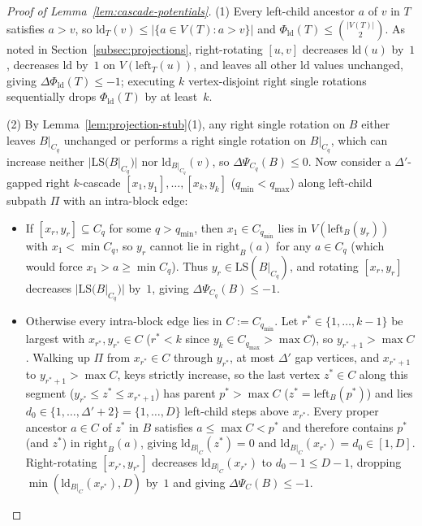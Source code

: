 \documentclass[11pt]{article}
\theoremstyle{definition}
\theoremstyle{remark}
\newcommand{\LS}{\mathrm{LS}}
\newcommand{\ld}{\mathrm{ld}}
\begin{document}
\begin{proof}[Proof of Lemma~\ref{lem:cascade-potentials}]
(1) Every left-child ancestor $a$ of $v$ in $T$ satisfies $a > v$, so $\ld_T(v) \le |\{a \in V(T) : a > v\}|$ and $\Phi_{\ld}(T) \le \binom{|V(T)|}{2}$. As noted in Section~\ref{subsec:projections}, right-rotating $[u, v]$ decreases $\ld(u)$ by~$1$, decreases $\ld$ by~$1$ on $V(\mathrm{left}_T(u))$, and leaves all other $\ld$ values unchanged, giving $\Delta\Phi_{\ld}(T) \le -1$; executing $k$ vertex-disjoint right single rotations sequentially drops $\Phi_{\ld}(T)$ by at least~$k$.

(2) By Lemma~\ref{lem:projection-stub}(1), any right single rotation on $B$ either leaves $B|_{C_q}$ unchanged or performs a right single rotation on $B|_{C_q}$, which can increase neither $|\LS(B|_{C_q})|$ nor $\ld_{B|_{C_q}}(v)$, so $\Delta\Psi_{C_q}(B) \le 0$. Now consider a $\Delta'$-gapped right $k$-cascade $[x_1, y_1], \dots, [x_k, y_k]$ ($q_{\min} < q_{\max}$) along left-child subpath $\Pi$ with an intra-block edge:
\begin{itemize}[leftmargin=2em]
  \item If $[x_r, y_r] \subseteq C_q$ for some $q > q_{\min}$, then $x_1 \in C_{q_{\min}}$ lies in $V(\mathrm{left}_B(y_r))$ with $x_1 < \min C_q$, so $y_r$ cannot lie in $\mathrm{right}_B(a)$ for any $a \in C_q$ (which would force $x_1 > a \ge \min C_q$). Thus $y_r \in \LS(B|_{C_q})$, and rotating $[x_r, y_r]$ decreases $|\LS(B|_{C_q})|$ by~$1$, giving $\Delta\Psi_{C_q}(B) \le -1$.
  \item Otherwise every intra-block edge lies in $C := C_{q_{\min}}$. Let $r^* \in \{1, \dots, k - 1\}$ be largest with $x_{r^*}, y_{r^*} \in C$ ($r^* < k$ since $y_k \in C_{q_{\max}} > \max C$), so $y_{r^*+1} > \max C$. Walking up $\Pi$ from $x_{r^*} \in C$ through $y_{r^*}$, at most $\Delta'$ gap vertices, and $x_{r^*+1}$ to $y_{r^*+1} > \max C$, keys strictly increase, so the last vertex $z^* \in C$ along this segment ($y_{r^*} \le z^* \le x_{r^*+1}$) has parent $p^* > \max C$ ($z^* = \mathrm{left}_B(p^*)$) and lies $d_0 \in \{1, \dots, \Delta' + 2\} = \{1, \dots, D\}$ left-child steps above $x_{r^*}$. Every proper ancestor $a \in C$ of $z^*$ in $B$ satisfies $a \le \max C < p^*$ and therefore contains $p^*$ (and $z^*$) in $\mathrm{right}_B(a)$, giving $\ld_{B|_C}(z^*) = 0$ and $\ld_{B|_C}(x_{r^*}) = d_0 \in [1, D]$. Right-rotating $[x_{r^*}, y_{r^*}]$ decreases $\ld_{B|_C}(x_{r^*})$ to $d_0 - 1 \le D - 1$, dropping $\min(\ld_{B|_C}(x_{r^*}), D)$ by~$1$ and giving $\Delta\Psi_C(B) \le -1$.\qedhere
\end{itemize}
\end{proof}
\end{document}
